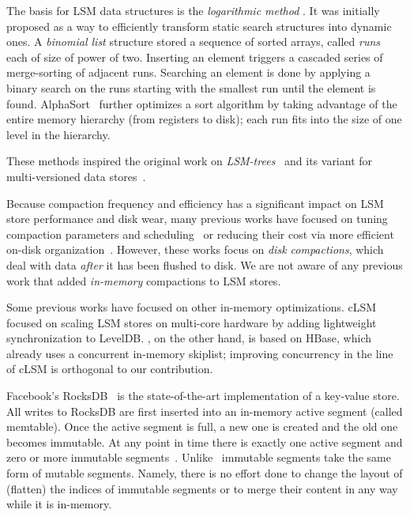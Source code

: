 The basis for LSM data structures is the \emph{logarithmic
method} \cite{Bentley79}.
It was initially
proposed as a way to efficiently transform static search structures into dynamic ones.
A \emph{binomial list} structure stored a sequence of sorted arrays, called
\emph{runs} each of size of power of two. Inserting an element triggers a
cascaded series of merge-sorting of adjacent runs. Searching an
element is done by applying a binary search on the runs starting with the
smallest run until the element is found.
AlphaSort~\cite{Nyberg95} further optimizes a sort algorithm by taking advantage of the entire memory hierarchy (from registers to disk); each run fits into the size of one level in the hierarchy.

These methods inspired the original work on
\emph{LSM-trees}~\cite{O'Neil1996} and its variant for multi-versioned
data stores~\cite{Muth1998}. 




Because compaction frequency and efficiency has a significant impact on LSM store performance and disk wear, 
many previous works have focused on tuning compaction parameters and scheduling~\cite{hbasetuning,rocksdb,
scylladbcompaction,universalcompaction,Sears:2012} or reducing their cost via more efficient on-disk organization~\cite{wisckey}. 
However, these works focus on \emph{disk compactions},
which deal with data \emph{after} it has been flushed to disk. We are not aware of any previous work that 
added \emph{in-memory} compactions to LSM stores.

Some previous works have focused on other in-memory optimizations. 
cLSM~\cite{clsm} focused on scaling LSM stores on multi-core hardware by adding lightweight synchronization to LevelDB. 
\sys, on the other hand, is based on HBase, which already uses a concurrent in-memory skiplist; improving concurrency
in the line of cLSM is orthogonal to our contribution.  

Facebook's RocksDB~\cite{rocksdb} is the state-of-the-art implementation of a key-value store.
All writes to RocksDB are first inserted into an in-memory active segment (called memtable). Once the active segment is full, a new one is created and the old one becomes immutable. At any point in time there is exactly one active segment and zero or more immutable segments~\cite{rocksdbtuning}. Unlike \sys\  immutable segments take the same form of mutable segments. Namely, there is no effort done to change the layout of (flatten) the indices of immutable segments or to merge their content in any way while it is in-memory.

